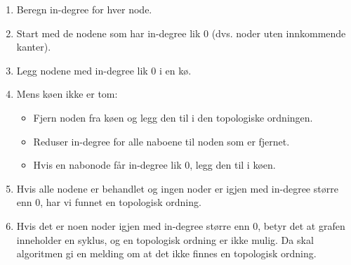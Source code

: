 \documentclass[12pt]{article}
\begin{document}
\begin{enumerate}
    \item Beregn in-degree for hver node.
    \item Start med de nodene som har in-degree lik 0 (dvs. noder uten innkommende kanter).
    \item Legg nodene med in-degree lik 0 i en kø.
    \item Mens køen ikke er tom:
    \begin{itemize}
        \item Fjern noden fra køen og legg den til i den topologiske ordningen.
        \item Reduser in-degree for alle naboene til noden som er fjernet.
        \item Hvis en nabonode får in-degree lik 0, legg den til i køen.
    \end{itemize}
    \item Hvis alle nodene er behandlet og ingen noder er igjen med in-degree større enn 0, har vi funnet en topologisk ordning.
    \item Hvis det er noen noder igjen med in-degree større enn 0, betyr det at grafen inneholder en syklus, og en topologisk ordning er ikke mulig. Da skal algoritmen gi en melding om at det ikke finnes en topologisk ordning.
\end{enumerate}
\end{document}
